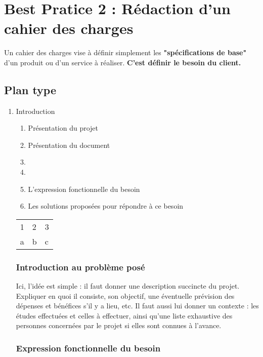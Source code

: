 \section{Best Pratice 2 : Rédaction d'un cahier des charges}

Un cahier des charges vise à définir simplement les \textbf{"spécifications de base"} d’un produit ou d’un service à réaliser.
\textbf{C'est définir le besoin du client.}
\subsection{Plan type}
    \begin{enumerate}
      \item  Introduction
        \begin{enumerate}
          \item Présentation du projet
          \item Présentation du document 
          \item
          \item  
      \item L'expression fonctionnelle du besoin
      \item Les solutions proposées pour répondre à ce besoin
    \end{enumerate}
  
\begin{tabular}{l >{\columncolor{gray}} l l}
   1 & 2 & 3 \\
   a & b & c
\end{tabular}
   
\subsubsection{Introduction au problème posé}


Ici, l'idée est simple : il faut donner une description succincte du projet. Expliquer en quoi il consiste, son objectif, une éventuelle prévision des dépenses et bénéfices s'il y a lieu, etc.
Il faut aussi lui donner un contexte : les études effectuées et celles à effectuer, ainsi qu'une liste exhaustive des personnes concernées par le projet si elles sont connues à l'avance.

\subsubsection{Expression fonctionnelle du besoin}


\end{enumerate}
